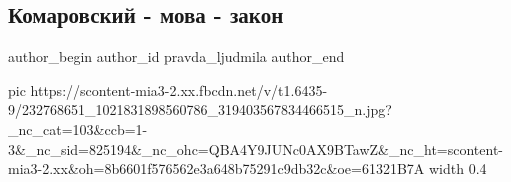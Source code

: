  
 
 
 
 
 
\subsection{Комаровский - мова - закон}
\label{sec:04_08_2021.fb.pravda_ljudmila.1.komarovskii_zakon_mova}
 
\ifcmt
 author_begin
   author_id pravda_ljudmila
 author_end
\fi

\ifcmt
  pic https://scontent-mia3-2.xx.fbcdn.net/v/t1.6435-9/232768651_1021831898560786_319403567834466515_n.jpg?_nc_cat=103&ccb=1-3&_nc_sid=825194&_nc_ohc=QBA4Y9JUNc0AX9BTawZ&_nc_ht=scontent-mia3-2.xx&oh=8b6601f576562e3a648b75291c9db32c&oe=61321B7A
  width 0.4
\fi

